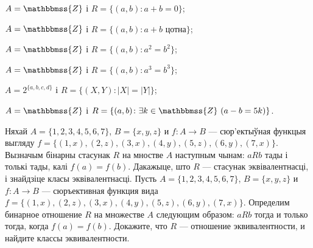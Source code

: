 \begin{problemList}
{\begin{belarusianEnumerate}
\item $A = \mathbbmss{Z}$ і $R = \{(a, b) \colon a + b = 0\}$;
\item $A = \mathbbmss{Z}$ і $R = \{(a, b) \colon a + b \,\,\text{цотна}\}$;
\item $A = \mathbbmss{Z}$ і $R = \{(a, b) \colon a^2 = b^2\}$;
\item $A = \mathbbmss{Z}$ і $R = \{(a, b) \colon a^3 = b^3\}$;
\item $A = 2^{\{a, b, c, d\}}$ і $R = \{(X, Y) \colon |X| = |Y|\}$;
\item $A = \mathbbmss{Z}$ і $R = \{(a, b) \colon \exists k \in \mathbbmss{Z} \,\, (a - b = 5k)\}$.
	
\end{belarusianEnumerate}
}

\bigskip

\problemItemSimple
{Няхай $A = \{1, 2, 3, 4, 5, 6, 7\}$, $B = \{x, y, z\}$ и $f \colon A \to B$ --- сюр'ектыўная функцыя выгляду $f = \{(1, x), (2, z), (3, x), (4, y), (5, z), (6, y), (7, x)\}$.
Вызначым бінарны стасунак $R$ на мностве $A$ наступным чынам: $aRb$ тады і толькі тады, калі $f(a) = f(b)$. Дакажыце, што $R$ ---  стасунак эквівалентнасці, і знайдзіце класы эквівалентнасці.}
{Пусть $A = \{1, 2, 3, 4, 5, 6, 7\}$, $B = \{x, y, z\}$ и $f \colon A \to B$ ---
сюръективная функция вида $f = \{(1, x), (2, z), (3, x), (4, y), (5, z), (6, y), (7, x)\}$.
Определим бинарное отношение $R$ на множестве $A$ следующим образом: $aRb$ тогда и только тогда, когда $f(a) = f(b)$. Докажите, что $R$ --- отношение эквивалентности, и найдите классы эквивалентности.}
	
\end{problemList}


